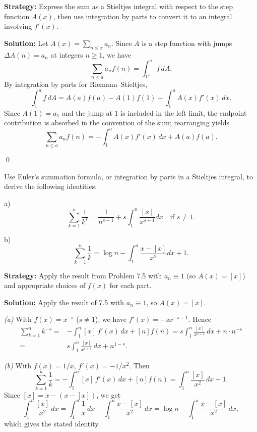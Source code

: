 \noindent\textbf{Strategy:} Express the sum as a Stieltjes integral with respect to the step function $A(x)$, then use integration by parts to convert it to an integral involving $f'(x)$.

\bigskip\noindent\textbf{Solution:}
Let $A(x)=\sum_{n\le x}a_n$. Since $A$ is a step function with jumps $\Delta A(n)=a_n$ at integers $n\ge 1$, we have
\[\sum_{n\le a} a_n f(n)=\int_{1^-}^{a} f\,dA.
\]
By integration by parts for Riemann–Stieltjes,
\[\int_{1}^{a} f\,dA= A(a)f(a)-A(1)f(1)-\int_{1}^{a} A(x) f'(x)\,dx.
\]
Since $A(1)=a_1$ and the jump at $1$ is included in the left limit, the endpoint contribution is absorbed in the convention of the sum; rearranging yields
\[\sum_{n\le a} a_n f(n)= -\int_{1}^{a} A(x) f'(x)\,dx + A(a)f(a).\]




\qed
\begin{problembox}
Use Euler's summation formula, or integration by parts in a Stieltjes integral, to derive the following identities:

a) \[ \sum_{k=1}^n \frac{1}{k^s} = \frac{1}{n^{s-1}} + s \int_1^n \frac{[x]}{x^{s+1}} dx \quad \text{if } s \neq 1. \]

b) \[ \sum_{k=1}^n \frac{1}{k} = \log n - \int_1^n \frac{x - [x]}{x^2} dx + 1. \]
\end{problembox}

\noindent\textbf{Strategy:} Apply the result from Problem 7.5 with $a_n \equiv 1$ (so $A(x) = [x]$) and appropriate choices of $f(x)$ for each part.

\bigskip\noindent\textbf{Solution:}
Apply the result of 7.5 with $a_n\equiv 1$, so $A(x)=[x]$.

\textit{(a)} With $f(x)=x^{-s}$ ($s\ne 1$), we have $f'(x)=-s x^{-s-1}$. Hence
\begin{align*}
\sum_{k=1}^n k^{-s} =& -\int_1^n [x]\,f'(x)\,dx + [n] f(n) = s\int_1^n \frac{[x]}{x^{s+1}}\,dx + n\cdot n^{-s} \\
=& s\int_1^n \frac{[x]}{x^{s+1}}\,dx + n^{1-s}.
\end{align*}

\textit{(b)} With $f(x)=1/x$, $f'(x)=-1/x^2$. Then
\[\sum_{k=1}^n \frac{1}{k} = -\int_1^n [x]\,f'(x)\,dx + [n]f(n) = \int_1^n \frac{[x]}{x^2}\,dx + 1.
\]
Since $[x]=x-(x-[x])$, we get
\[\int_1^n \frac{[x]}{x^2}\,dx = \int_1^n \frac{1}{x}\,dx - \int_1^n \frac{x-[x]}{x^2}\,dx = \log n - \int_1^n \frac{x-[x]}{x^2}\,dx,
\]
which gives the stated identity.




